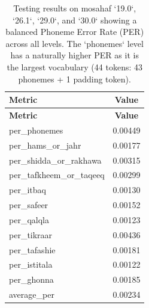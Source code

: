 \begin{longtable}{|l|c|}
\caption{Testing results on mosahaf `19.0`, `26.1`, `29.0`, and `30.0` showing a balanced Phoneme Error Rate (PER) across all levels. The `phonemes` level has a naturally higher PER as it is the largest vocabulary (44 tokens: 43 phonemes + 1 padding token).}
\label{tab:results_v3}\\
\hline
\textbf{Metric} & \textbf{Value} \\ 
\hline
\endfirsthead
\hline
\textbf{Metric} & \textbf{Value} \\
\hline
\endhead
per\_phonemes & 0.00449 \\
\hline
per\_hams\_or\_jahr & 0.00177 \\
\hline
per\_shidda\_or\_rakhawa & 0.00315 \\
\hline
per\_tafkheem\_or\_taqeeq & 0.00299 \\
\hline
per\_itbaq & 0.00130 \\
\hline
per\_safeer & 0.00152 \\
\hline
per\_qalqla & 0.00123 \\
\hline
per\_tikraar & 0.00436 \\
\hline
per\_tafashie & 0.00181 \\
\hline
per\_istitala & 0.00122 \\
\hline
per\_ghonna & 0.00185 \\
\hline
average\_per & 0.00234 \\
\hline
\end{longtable}
